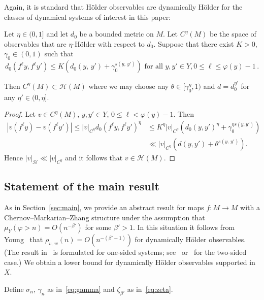 \documentclass[AHL,Unicode,longabstracts,published]{cedram}
\newcommand{\cH}{\mathcal{H}}
\begin{document}
Again, it is standard that H\"older observables are dynamically H\"older for the classes of dynamical systems of interest in this paper:

\begin{prop}\label{prop:dyn2}
Let $\eta\in(0,1]$ and let $d_0$ be a bounded metric on $M$. Let $C^\eta(M)$ be the space of observables that are $\eta$-H\"older with respect to $d_0$. Suppose that there exist $K>0$, $\gamma_0\in(0,1)$ such that
\[
d_0\left(f^\ell y,f^\ell y'\right)\le K\left(d_0(y,\,y')+\gamma_0^{s(y,\,y')}\right)\text{ for all }y,y'\in Y, 0\le\ell\le \varphi(y)-1\,.
\]

Then $C^\eta(M)\subset \cH(M)$ where we may choose any $\theta\in[\gamma_0^\eta,1)$ and $d=d_0^{\eta'}$ for any $\eta'\in(0,\eta]$.
\end{prop}

\begin{proof}
Let $v\in C^\eta(M)$, $y,y'\in Y$, $0\le\ell<\varphi(y)-1$. Then
\begin{align*}
\left|v\left(f^\ell y\right)- v\left(f^\ell y'\right)\right|
\le {|v|}_{C^\eta}d_0\left(f^\ell y,f^\ell y'\right)^\eta & \le K^\eta {|v|}_{C^\eta} \left(d_0(y,y')^\eta+\gamma_0^{\eta s(y,y')}\right)
\\ & \ll {|v|}_{C^\eta} \left(d(y,y')+\theta^{s(y,\,y')}\right).
\end{align*}
Hence ${|v|}_{\cH}\ll {|v|}_{C^\eta}$ and it follows that $v\in \cH(M)$.
\end{proof}

\subsection{Statement of the main result}\label{sec:state2}

As in Section~\ref{sec:main}, we provide an abstract result for maps $f:M\to M$ with a Chernov--Markarian--Zhang structure under the assumption that $\mu_Y(\varphi>n)=O(n^{-\beta'})$ for some $\beta'>1$. In this situation it follows from Young~\cite{Young99} that $\rho_{v,\,w}(n)=O(n^{-(\beta'-1)})$ for dynamically H\"older observables. (The result in~\cite{Young99} is formulated for one-sided systems; see~\cite[Theorem~2.10]{KKM19} or~\cite[Appendix~B]{MT14} for the two-sided case.) We obtain a lower bound for dynamically H\"older observables supported in $X$.

Define $\sigma_n,\,\gamma_n$ as in~\eqref{eq:gamma} and $\zeta_{\beta'}$ as in~\eqref{eq:zeta}.
\end{document}
